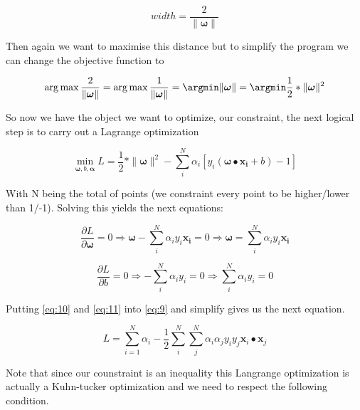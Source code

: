 \documentclass[a4paper,11pt]{article}
\numberwithin{equation}{section}
\DeclareMathOperator*{\argmax}{arg\,max}
\begin{document}
\begin{equation}
width = \frac{2}{\|\boldsymbol{\omega}\|}
\end{equation}

Then again we want to maximise this distance but to simplify the program we can change the objective function to

\begin{equation}\label{eq:8}
 \argmax \frac{2}{\|\boldsymbol{\omega}\|} = \argmax \frac{1}{\|\boldsymbol{\omega}\|} = \argmin \|\boldsymbol{\omega}\| = \argmin \frac{1}{2}*\|\boldsymbol{\omega}\|^2
\end{equation}


So now we have the object we want to optimize, our constraint, the next logical step is to carry out a Lagrange optimization

\begin{equation}\label{eq:9}
 \min_{\boldsymbol{\omega},b,\boldsymbol{\alpha}} L= \frac{1}{2}*\|\boldsymbol{\omega}\|^2 - \sum_{i}^{N}\alpha_i[y_i(\boldsymbol{\omega}\bullet{\boldsymbol{x_i}}+b)-1]
\end{equation}

With N being the total of points (we constraint every point to be higher/lower than 1/-1). Solving this yields the next equations:

\begin{equation}\label{eq:10}
 \frac{\partial L}{\partial\boldsymbol{\omega} } = 0 \Longrightarrow \boldsymbol{\omega} - \sum_{i}^{N}\alpha_iy_i\boldsymbol{x_i} = 0 \Longrightarrow \boldsymbol{\omega} =  \sum_{i}^{N}\alpha_iy_i\boldsymbol{x_i}
\end{equation}

\begin{equation}\label{eq:11}
\frac{\partial L}{\partial b}  = 0 \Longrightarrow - \sum_{i}^{N}\alpha_iy_i = 0 \Longrightarrow \sum_{i}^{N}\alpha_iy_i = 0
\end{equation}

Putting \ref{eq:10} and \ref{eq:11} into \ref{eq:9} and simplify gives us the next equation.

\begin{equation}\label{eq:12}
 L = \sum_{i=1}^{N}\alpha_i-\frac{1}{2}\sum_{i}^{N}\sum_{j}^{N}\alpha_i\alpha_jy_iy_j\boldsymbol{x}_i\bullet\boldsymbol{x}_j
\end{equation}

Note that since our counstraint is an inequality this Langrange optimization is actually a Kuhn-tucker optimization and we need to respect the following condition.
\end{document}
